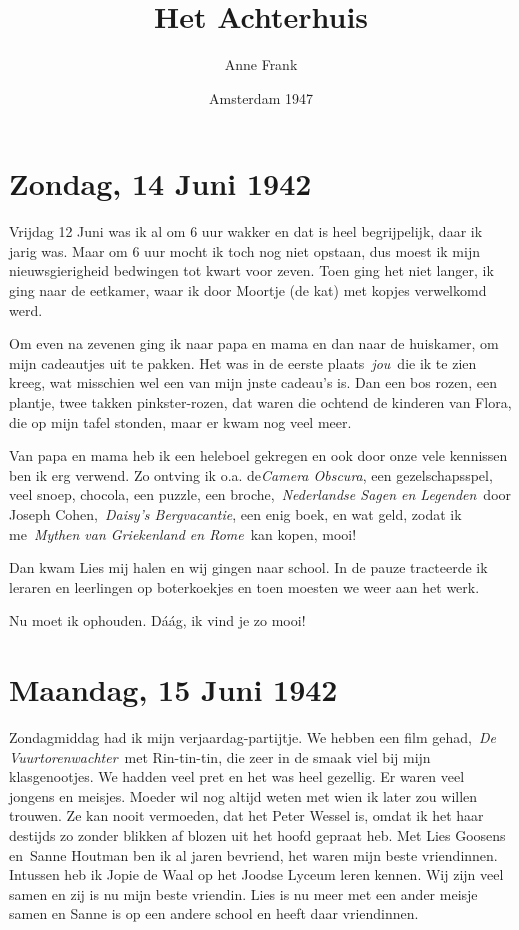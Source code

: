 \documentclass{book}
\title{Het Achterhuis}
\author{Anne Frank}
\date{Amsterdam 1947}
\begin{document}
\maketitle

\newpage


\section*{Zondag, 14 Juni 1942}

Vrijdag 12 Juni was ik al om 6 uur wakker en dat is heel begrijpelijk, daar ik
jarig was. Maar om 6 uur mocht ik toch nog niet opstaan, dus moest ik mijn
nieuwsgierigheid bedwingen tot kwart voor zeven. Toen ging het niet langer, ik
ging naar de eetkamer, waar ik door Moortje (de kat) met kopjes verwelkomd werd.

Om even na zevenen ging ik naar papa en mama en dan naar de huiskamer, om mijn
cadeautjes uit te pakken. Het was in de eerste plaats~\emph{jou}~die ik te zien
kreeg, wat misschien wel een van mijn jnste cadeau's is. Dan een bos rozen, een
plantje, twee takken pinkster-rozen, dat waren die ochtend de kinderen van
Flora, die op mijn tafel stonden, maar er kwam nog veel meer.

Van papa en mama heb ik een heleboel gekregen en ook door onze vele kennissen
ben ik erg verwend. Zo ontving ik o.a. de\emph{Camera Obscura}, een
gezelschapsspel, veel snoep, chocola, een puzzle, een broche,~\emph{Nederlandse
Sagen en Legenden}~door Joseph Cohen,~\emph{Daisy's Bergvacantie}, een enig
boek, en wat geld, zodat ik me~\emph{Mythen van Griekenland en Rome}~kan kopen,
mooi!

Dan kwam Lies mij halen en wij gingen naar school. In de pauze tracteerde ik
leraren en leerlingen op boterkoekjes en toen moesten we weer aan het werk.

Nu moet ik ophouden. Dáág, ik vind je zo mooi!

\section*{Maandag, 15 Juni 1942}

Zondagmiddag had ik mijn verjaardag-partijtje. We hebben een film
gehad,~\emph{De Vuurtorenwachter}~met Rin-tin-tin, die zeer in de smaak viel bij
mijn klasgenootjes. We hadden veel pret en het was heel gezellig. Er waren veel
jongens en meisjes. Moeder wil nog altijd weten met wien ik later zou willen
trouwen. Ze kan nooit vermoeden, dat het Peter Wessel is, omdat ik het haar
destijds zo zonder blikken af blozen uit het hoofd gepraat heb. Met Lies Goosens
en~Sanne Houtman ben ik al jaren bevriend, het waren mijn beste vriendinnen.
Intussen heb ik Jopie de Waal op het Joodse Lyceum leren kennen. Wij zijn veel
samen en zij is nu mijn beste vriendin. Lies is nu meer met een ander meisje
samen en Sanne is op een andere school en heeft daar vriendinnen.
\end{document}
